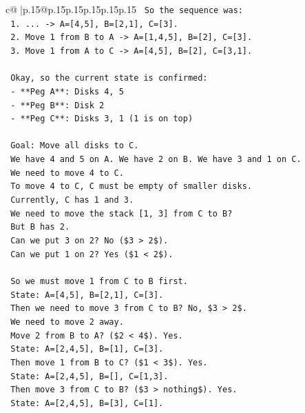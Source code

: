 \documentclass{article}
\begin{document}
{\begin{supertabular}{c@{$\;$}|p{.15\linewidth}@{}p{.15\linewidth}p{.15\linewidth}p{.15\linewidth}p{.15\linewidth}p{.15\linewidth}}
{{{\texttt{   So the sequence was:} \\
\texttt{   1. ... {-}> A={[}4,5{]}, B={[}2,1{]}, C={[}3{]}.} \\
\texttt{   2. Move 1 from B to A {-}> A={[}1,4,5{]}, B={[}2{]}, C={[}3{]}.} \\
\texttt{   3. Move 1 from A to C {-}> A={[}4,5{]}, B={[}2{]}, C={[}3,1{]}.} \\
\\ 
\texttt{   Okay, so the current state is confirmed:} \\
\texttt{   {-} **Peg A**: Disks 4, 5} \\
\texttt{   {-} **Peg B**: Disk 2} \\
\texttt{   {-} **Peg C**: Disks 3, 1 (1 is on top)} \\
\\ 
\texttt{   Goal: Move all disks to C.} \\
\texttt{   We have 4 and 5 on A. We have 2 on B. We have 3 and 1 on C.} \\
\texttt{   We need to move 4 to C.} \\
\texttt{   To move 4 to C, C must be empty of smaller disks.} \\
\texttt{   Currently, C has 1 and 3.} \\
\texttt{   We need to move the stack {[}1, 3{]} from C to B?} \\
\texttt{   But B has 2.} \\
\texttt{   Can we put 3 on 2? No (\$3 > 2\$).} \\
\texttt{   Can we put 1 on 2? Yes (\$1 < 2\$).} \\
\\ 
\texttt{   So we must move 1 from C to B first.} \\
\texttt{   State: A={[}4,5{]}, B={[}2,1{]}, C={[}3{]}.} \\
\texttt{   Then we need to move 3 from C to B? No, \$3 > 2\$.} \\
\texttt{   We need to move 2 away.} \\
\texttt{   Move 2 from B to A? (\$2 < 4\$). Yes.} \\
\texttt{   State: A={[}2,4,5{]}, B={[}1{]}, C={[}3{]}.} \\
\texttt{   Then move 1 from B to C? (\$1 < 3\$). Yes.} \\
\texttt{   State: A={[}2,4,5{]}, B={[}{]}, C={[}1,3{]}.} \\
\texttt{   Then move 3 from C to B? (\$3 > nothing\$). Yes.} \\
\texttt{   State: A={[}2,4,5{]}, B={[}3{]}, C={[}1{]}.} \\
}}}
\end{supertabular}}
\end{document}
